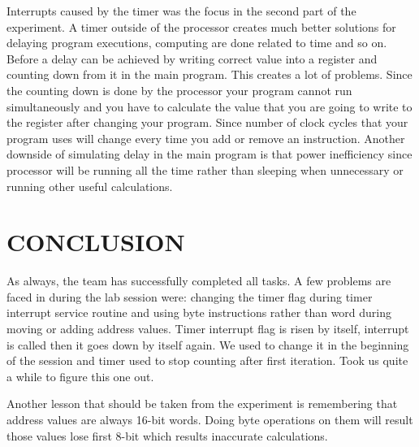 \documentclass[pdftex,12pt,a4paper]{article}
\begin{document}
Interrupts caused by the timer was the focus in the second part of the experiment. A timer outside of the processor creates much better solutions for delaying program executions, computing are done related to time and so on. Before a delay can be achieved by writing correct value into a register and counting down from it in the main program. This creates a lot of problems. Since the counting down is done by the processor your program cannot run simultaneously and you have to calculate the value that you are going to write to the register after changing your program. Since number of clock cycles that your program uses will change every time you add or remove an instruction. Another downside of simulating delay in the main program is that power inefficiency since processor will be running all the time rather than sleeping when unnecessary or running other useful calculations.



\newpage
\section{CONCLUSION}


As always, the team has successfully completed all tasks. A few problems are faced in during the lab session were: changing the timer flag during timer interrupt service routine and using byte instructions rather than word during moving or adding address values. Timer interrupt flag is risen by itself, interrupt is called then it goes down by itself again. We used to change it in the beginning of the session and timer used to stop counting after first iteration. Took us quite a while to figure this one out.

Another lesson that should be taken from the experiment is remembering that address values are always 16-bit words. Doing byte operations on them will result those values lose first 8-bit which results inaccurate calculations. 


\nocite{overleaf}
\nocite{reportGuide}
\newpage
{}



\end{document}
